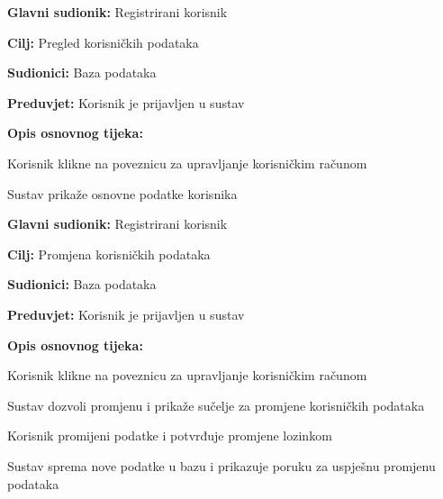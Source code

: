 \noindent {}
\begin{packed_item}
	
	\item \textbf{Glavni sudionik: } Registrirani korisnik
	\item  \textbf{Cilj:} Pregled korisničkih podataka
	\item  \textbf{Sudionici:} Baza podataka
	\item  \textbf{Preduvjet:} Korisnik je prijavljen u sustav
	\item  \textbf{Opis osnovnog tijeka:}
	
	\item[] \begin{packed_enum}
		
		\item Korisnik klikne na poveznicu za upravljanje korisničkim računom
		\item Sustav prikaže osnovne podatke korisnika
	\end{packed_enum}
	
\end{packed_item}

\noindent {}
\begin{packed_item}
	
	\item \textbf{Glavni sudionik: } Registrirani korisnik
	\item  \textbf{Cilj:} Promjena korisničkih podataka
	\item  \textbf{Sudionici:} Baza podataka
	\item  \textbf{Preduvjet:} Korisnik je prijavljen u sustav
	\item  \textbf{Opis osnovnog tijeka:}
	
	\item[] \begin{packed_enum}
		
		\item Korisnik klikne na poveznicu za upravljanje korisničkim računom
		\item Sustav dozvoli promjenu i prikaže sučelje za promjene korisničkih
		podataka
		\item Korisnik promijeni podatke i potvrđuje promjene lozinkom
		\item Sustav sprema nove podatke u bazu i prikazuje poruku za uspješnu
		promjenu podataka
	\end{packed_enum}
	
\end{packed_item}

